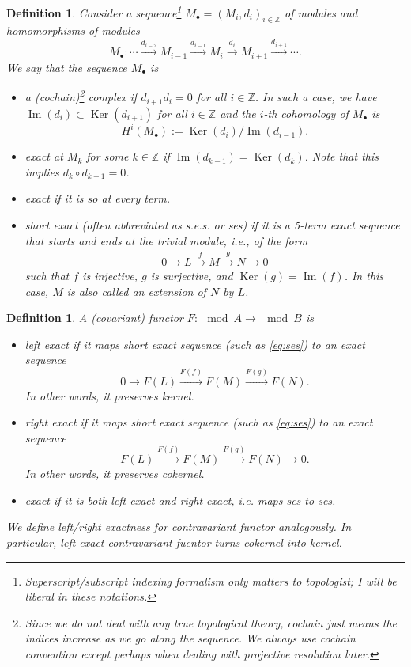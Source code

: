 \documentclass[11pt,a4paper]{article}
\numberwithin{equation}{section}
\theoremstyle{all}
\newtheorem{definition}[theorem]{Definition}
\theoremstyle{remark}
\newcommand{\Z}{\mathbb{Z}}
\renewcommand{\Im}{\operatorname{Im}\nolimits}
\newcommand{\Ker}{\operatorname{Ker}\nolimits}
\newcommand{\defn}[1]{\textsl{\color{darkblue} #1}}
\begin{document}
\begin{definition}
Consider a sequence\footnote{Superscript/subscript indexing formalism only matters to topologist; I will be liberal in these notations.} $M_\bullet = (M_i, d_i)_{i\in \Z}$ of modules and homomorphisms of modules
\[
M_\bullet: \cdots \xrightarrow{d_{i-2}} M_{i-1}\xrightarrow{d_{i-1}} M_i \xrightarrow{d_{i}} M_{i+1} \xrightarrow{d_{i+1}}\cdots.
\]
We say that the sequence $M_\bullet$ is
\begin{itemize}
\item a (cochain)\footnote{Since we do not deal with any true topological theory, cochain just means the indices increase as we go along the sequence.  We always use cochain convention except perhaps when dealing with projective resolution later.} \defn{complex} if $d_{i+1}d_{i}=0$ for all $i\in\Z$.  In such a case, we have $\Im(d_i)\subset \Ker(d_{i+1})$ for all $i\in \Z$ and the $i$-th \defn{cohomology} of $M_\bullet$ is 
\[
H^i(M_\bullet):=\Ker(d_{i})/\Im(d_{i-1}).
\]

\item \defn{exact} at $M_k$ for some $k\in\Z$ if $\Im(d_{k-1})=\Ker(d_k)$.  Note that this implies $d_k\circ d_{k-1}=0$.

\item \defn{exact} if it is so at every term.

\item \defn{short exact} (often abbreviated as \defn{s.e.s.} or \defn{ses}) if it is a 5-term exact sequence that starts and ends at the trivial module, i.e., of the form
\begin{align}\label{eq:ses}
0\to L\xrightarrow{f} M \xrightarrow{g} N\to 0 
\end{align}
such that $f$ is injective, $g$ is surjective, and $\Ker(g)=\Im(f)$.  In this case, $M$ is also called an \defn{extension} of $N$ by $L$.
\end{itemize}
\end{definition}

\begin{definition}
A (covariant) functor $F:\mod A\to \mod B$ is 
\begin{itemize}
\item \defn{left exact} if it maps short exact sequence (such as \eqref{eq:ses}) to an exact sequence
\[
0\to F(L)\xrightarrow{F(f)} F(M)\xrightarrow{F(g)} F(N).
\]
In other words, it preserves kernel.

\item \defn{right exact} if it maps short exact sequence (such as \eqref{eq:ses}) to an exact sequence
\[
F(L)\xrightarrow{F(f)} F(M)\xrightarrow{F(g)} F(N) \to 0.
\]
In other words, it preserves cokernel.

\item \defn{exact} if it is both left exact and right exact, i.e. maps ses to ses.
\end{itemize}
We define left/right exactness for contravariant functor analogously.  In particular, left exact contravariant fucntor turns cokernel into kernel.
\end{definition}
\end{document}
